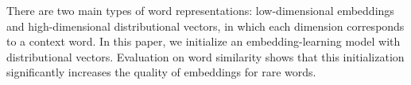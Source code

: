 There are two main types of word representations: low-dimensional embeddings and high-dimensional distributional vectors, in which each dimension corresponds to a context word. In this paper, we initialize an embedding-learning model with distributional vectors. Evaluation on word similarity shows that this initialization significantly increases the quality of embeddings for rare words.
